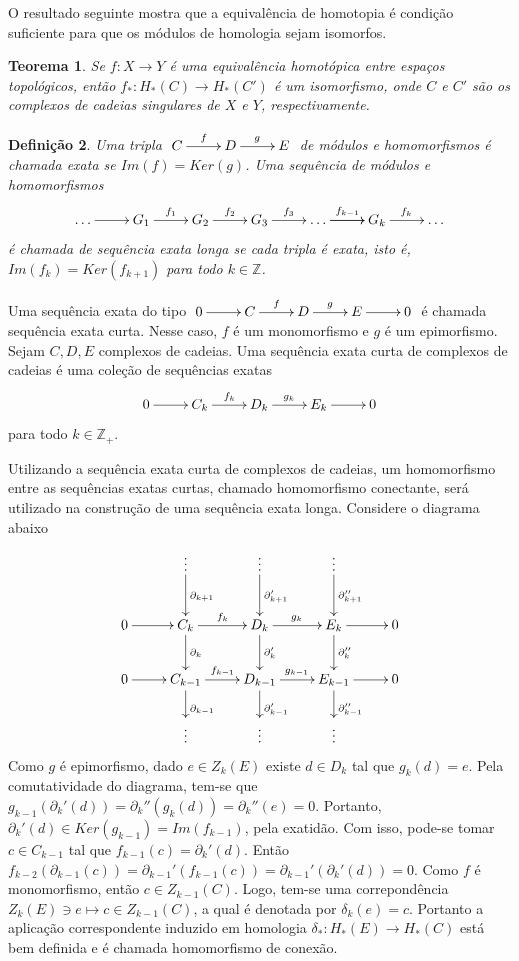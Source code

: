 \documentclass[12pt]{book}
\newtheorem{teorema}{Teorema}[section]
\newtheorem{definicao}[teorema]{Definição}
\newcommand{\bordo}[1]{\partial_{#1}}
\newcommand{\homologiaabrev}[2]{H_{#1}(#2)}
\newcommand{\inteiros}{\mathbb{Z}}
\newcommand{\kernelbordoabrev}[2]{Z_{#1}(#2)}
\begin{document}
	O resultado seguinte mostra que a equivalência de homotopia é condição suficiente para que os módulos de homologia sejam isomorfos.
	
	\begin{teorema}
		Se $f: X \to Y$ é uma equivalência homotópica entre espaços topológicos, então $f_{*}:\homologiaabrev{*}{C} \to \homologiaabrev{*}{C'}$ é um isomorfismo, onde $C$ e $C'$ são os complexos de cadeias singulares de $X$ e $Y$, respectivamente.
	\end{teorema}
	
	\begin{definicao}
		Uma tripla $\xymatrix{C\ar[r]^{f} & D\ar[r]^{g} & E }$ de módulos e homomorfismos é chamada exata se $Im(f) = Ker(g)$. Uma sequência de módulos e homomorfismos
		$$
		\xymatrix{\dots \ar[r]& G_{1}\ar[r]^{f_{1}} & G_{2}\ar[r]^{f_{2}} & G_{3}\ar[r]^{f_{3}} & \dots \ar[r]\ar[r]^{f_{k-1}} & G_{k}\ar[r]^{f_{k}} &\dots}
		$$
		é chamada de sequência exata longa se cada tripla é exata, isto é, $Im(f_{k}) = Ker(f_{k+1})$ para todo $k\in \inteiros$.
	\end{definicao}
	
	Uma sequência exata do tipo $ \xymatrix{0 \ar[r] & C\ar[r]^{f} & D\ar[r]^{g} & E \ar[r]& 0}$ é chamada sequência exata curta. Nesse caso, $f$ é um monomorfismo e $g$ é um epimorfismo. Sejam $C, D, E$ complexos de cadeias. Uma sequência exata curta de complexos de cadeias é uma coleção de sequências exatas
	$$ 
	\xymatrix{0 \ar[r] & C_{k}\ar[r]^{f_{k}} & D_{k}\ar[r]^{g_{k}} & E_{k} \ar[r]& 0}
	$$
	para todo $k \in \inteiros_{+}$.
	
	Utilizando a sequência exata curta de complexos de cadeias, um homomorfismo entre as sequências exatas curtas, chamado homomorfismo conectante, será utilizado na construção de uma sequência exata longa. Considere o diagrama abaixo
	$$
	\xymatrix{
		 & \vdots \ar[d]^{\bordo{k+1}} & \vdots \ar[d]^{\bordo{k+1}'} & \vdots \ar[d]^{\bordo{k+1}''}& 
		\\
		0 \ar[r] & C_{k}\ar[d]^{\bordo{k}}\ar[r]^{f_{k}} & D_{k}\ar[d]^{\bordo{k}'}\ar[r]^{g_{k}} & E_{k} \ar[d]^{\bordo{k}''}\ar[r]& 0
		\\
		0 \ar[r] & C_{k-1}\ar[d]^{\bordo{k-1}}\ar[r]^{f_{k-1}} & D_{k-1}\ar[d]^{\bordo{k-1}'}\ar[r]^{g_{k-1}} & E_{k-1}\ar[d]^{\bordo{k-1}''} \ar[r]& 0
		\\
		 & \vdots & \vdots  & \vdots & 
	}
	$$
	Como $g$ é epimorfismo, dado $e \in \kernelbordoabrev{k}{E}$ existe $d \in D_{k}$ tal que $g_{k}(d) = e$. Pela comutatividade do diagrama, tem-se que $g_{k-1}(\bordo{k}'(d)) = \bordo{k}''(g_{k}(d)) = \bordo{k}''(e) = 0$. Portanto, $\bordo{k}'(d) \in Ker(g_{k-1}) = Im(f_{k-1})$, pela exatidão. Com isso, pode-se tomar $c \in C_{k-1}$ tal que $f_{k-1}(c)=\bordo{k}'(d)$. Então $f_{k-2}(\bordo{k-1}(c)) = \bordo{k-1}'(f_{k-1}(c)) = \bordo{k-1}'(\bordo{k}'(d)) = 0$. Como $f$ é monomorfismo, então $c\in \kernelbordoabrev{k-1}{C}$. Logo, tem-se uma correpondência $\kernelbordoabrev{k}{E} \ni e \mapsto c \in \kernelbordoabrev{k-1 }{C}$, a qual é denotada por $\delta_{k}(e) = c$. Portanto a aplicação correspondente induzido em homologia $\delta_{*}:H_{*}(E) \to H_{*}(C)$ está bem definida e é chamada homomorfismo de conexão.
	
\end{document}
